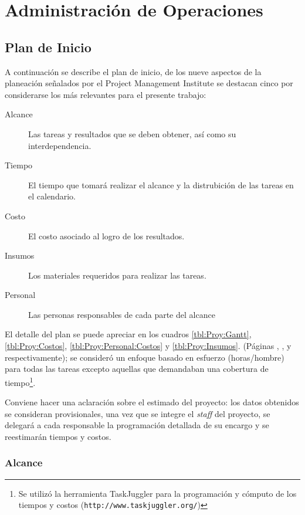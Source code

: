\chapter{Administración de Operaciones}

\section{Plan de Inicio}
\label{sec:Plan:Inicio}

A continuación se describe el plan de inicio, de los nueve aspectos de la planeación señalados por el Project Management Institute \citep{PMBOK2008} se destacan cinco por considerarse los más relevantes para el presente trabajo:

\begin{description}
	\item [Alcance]  Las tareas y resultados que se deben obtener, así como su interdependencia.
	\item [Tiempo]   El tiempo que tomará realizar el alcance y la distrubición de las tareas en el calendario.
	\item [Costo]    El costo asociado al logro de los resultados.
	\item [Insumos]  Los materiales requeridos para realizar las tareas.
	\item [Personal] Las personas responsables de cada parte del alcance
\end{description}

El detalle del plan se puede apreciar en los cuadros \ref{tbl:Proy:Gantt}, \ref{tbl:Proy:Costos}, \ref{tbl:Proy:Personal:Costos} y \ref{tbl:Proy:Insumos}. (Páginas \pageref{tbl:Proy:Gantt}, \pageref{tbl:Proy:Costos}, \pageref{tbl:Proy:Personal:Costos} y \pageref{tbl:Proy:Insumos} respectivamente); se consideró un enfoque basado en esfuerzo (horas/hombre) para todas las tareas excepto aquellas que demandaban una cobertura de tiempo\footnote{Se utilizó la herramienta TaskJuggler para la programación y cómputo de los tiempos y costos (\texttt{http://www.taskjuggler.org/})}.

Conviene hacer una aclaración sobre el estimado del proyecto: los datos obtenidos se consideran provisionales, una vez que se integre el \emph{staff} del proyecto, se delegará a cada responsable la programación detallada de su encargo y se reestimarán tiempos y costos.\label{sec:Proy:Aclaracion}

\subsection{Alcance}


